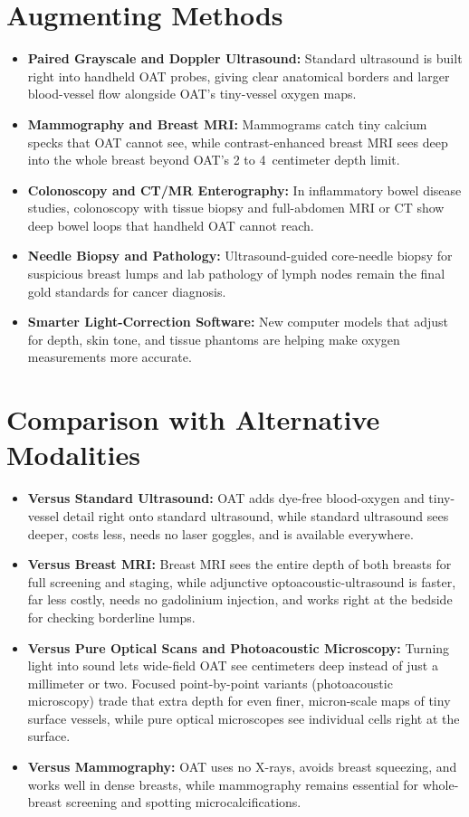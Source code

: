 \section{Augmenting Methods}
\begin{itemize}
  \item \textbf{Paired Grayscale and Doppler Ultrasound:} Standard ultrasound is built right into handheld OAT probes, giving clear anatomical borders and larger blood-vessel flow alongside OAT's tiny-vessel oxygen maps.
  \item \textbf{Mammography and Breast MRI:} Mammograms catch tiny calcium specks that OAT cannot see, while contrast-enhanced breast MRI sees deep into the whole breast beyond OAT's 2 to 4~centimeter depth limit.
  \item \textbf{Colonoscopy and CT/MR Enterography:} In inflammatory bowel disease studies, colonoscopy with tissue biopsy and full-abdomen MRI or CT show deep bowel loops that handheld OAT cannot reach.
  \item \textbf{Needle Biopsy and Pathology:} Ultrasound-guided core-needle biopsy for suspicious breast lumps and lab pathology of lymph nodes remain the final gold standards for cancer diagnosis.
  \item \textbf{Smarter Light-Correction Software:} New computer models that adjust for depth, skin tone, and tissue phantoms are helping make oxygen measurements more accurate.
\end{itemize}

\section{Comparison with Alternative Modalities}
\begin{itemize}
  \item \textbf{Versus Standard Ultrasound:} OAT adds dye-free blood-oxygen and tiny-vessel detail right onto standard ultrasound, while standard ultrasound sees deeper, costs less, needs no laser goggles, and is available everywhere.
  \item \textbf{Versus Breast MRI:} Breast MRI sees the entire depth of both breasts for full screening and staging, while adjunctive optoacoustic-ultrasound is faster, far less costly, needs no gadolinium injection, and works right at the bedside for checking borderline lumps.
  \item \textbf{Versus Pure Optical Scans and Photoacoustic Microscopy:} Turning light into sound lets wide-field OAT see centimeters deep instead of just a millimeter or two. Focused point-by-point variants (photoacoustic microscopy) trade that extra depth for even finer, micron-scale maps of tiny surface vessels, while pure optical microscopes see individual cells right at the surface.
  \item \textbf{Versus Mammography:} OAT uses no X-rays, avoids breast squeezing, and works well in dense breasts, while mammography remains essential for whole-breast screening and spotting microcalcifications.
\end{itemize}

